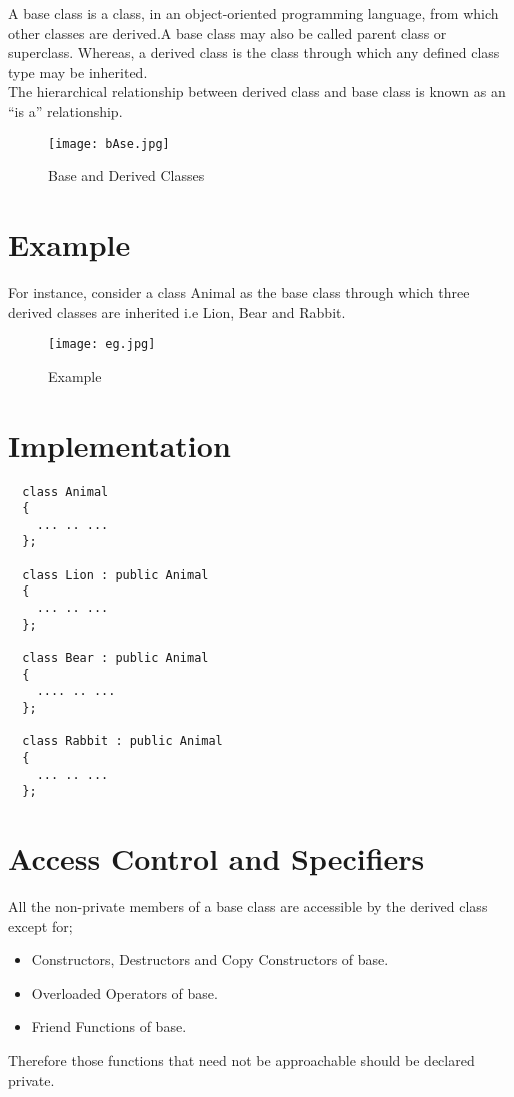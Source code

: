 \documentclass[11pt,fleqn]{book} %
\begin{document}
A base class is a class, in an object-oriented programming language, from which other classes are derived.A base class may also be called parent class or superclass. Whereas, a derived class is the class through which any defined class type may be inherited.\\
The hierarchical relationship between derived class and base class is known as an “is a” relationship.
\begin{figure}[h]
  \centering\texttt{[image: bAse.jpg]}
  \caption{Base and Derived Classes}
\end{figure}

\newpage
\section{Example}

For instance, consider a class Animal as the base class through which three derived classes are inherited i.e Lion, Bear and Rabbit.

\begin{figure}[h]
  \centering\texttt{[image: eg.jpg]}
  \caption{Example}
\end{figure}
\hfill

\newpage
\section{Implementation}
\begin{lstlisting}
  class Animal 
  {
    ... .. ...
  };

  class Lion : public Animal
  {
    ... .. ...
  };

  class Bear : public Animal
  {
    .... .. ...
  };

  class Rabbit : public Animal 
  {
    ... .. ...
  };
\end{lstlisting}
\hfill 
\section{Access Control and Specifiers}
All the non-private members of a base class are accessible by the derived class except for;

\begin{itemize}
\item Constructors, Destructors and Copy Constructors of base.
\item Overloaded Operators of base.
\item Friend Functions of base.
\end{itemize}
Therefore those functions that need not be approachable should be declared private.
\end{document}
